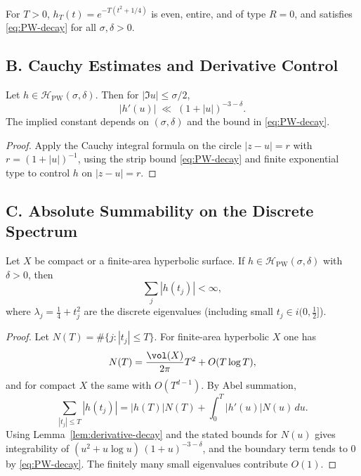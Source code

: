 \begin{example}
\label{ex:heat-probe}
For $T>0$, $h_T(t)=e^{-T(t^2+1/4)}$ is even, entire, and of type $R=0$, and satisfies \eqref{eq:PW-decay} for all $\sigma,\delta>0$.
\end{example}

\subsection*{B. Cauchy Estimates and Derivative Control}
\label{subsec:cauchy-derivative}

\begin{lemma}
\label{lem:derivative-decay}
Let $h\in \mathcal H_{\mathrm{PW}}(\sigma,\delta)$. Then for $|\Im u|\le \sigma/2$,
\[
  |h'(u)| \;\ll\; (1+|u|)^{-3-\delta}.
\]
The implied constant depends on $(\sigma,\delta)$ and the bound in \eqref{eq:PW-decay}.
\end{lemma}

\begin{proof}
Apply the Cauchy integral formula on the circle $|z-u|=r$ with $r=(1+|u|)^{-1}$, using the strip bound \eqref{eq:PW-decay} and finite exponential type to control $h$ on $|z-u|=r$.
\end{proof}

\subsection*{C. Absolute Summability on the Discrete Spectrum}
\label{subsec:absolute-sum}

\begin{proposition}
\label{prop:absolute-sum}
Let $X$ be compact or a finite-area hyperbolic surface. If $h\in \mathcal H_{\mathrm{PW}}(\sigma,\delta)$ with $\delta>0$, then
\[
  \sum_{j} |h(t_j)| < \infty,
\]
where $\lambda_j=\tfrac14+t_j^2$ are the discrete eigenvalues (including small $t_j\in i(0,\tfrac12]$).
\end{proposition}

\begin{proof}
Let $N(T)=\#\{j:|t_j|\le T\}$. For finite-area hyperbolic $X$ one has
\[
  N(T)=\frac{\vol(X)}{2\pi}T^2+O(T\log T),
\]
and for compact $X$ the same with $O(T^{d-1})$. By Abel summation,
\[
  \sum_{|t_j|\le T} |h(t_j)| = |h(T)|N(T) + \int_0^T |h'(u)|N(u)\,du.
\]
Using Lemma~\ref{lem:derivative-decay} and the stated bounds for $N(u)$ gives integrability of
\(
  (u^2+u\log u)\,(1+u)^{-3-\delta}
\),
and the boundary term tends to $0$ by \eqref{eq:PW-decay}. The finitely many small eigenvalues contribute $O(1)$.
\end{proof}

